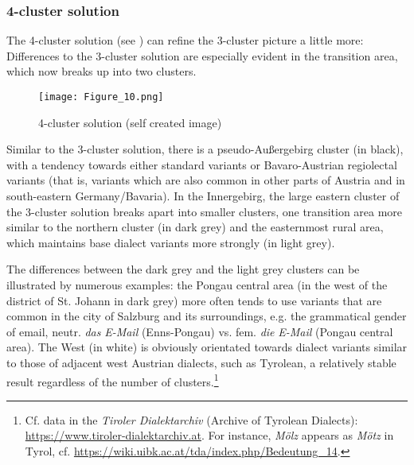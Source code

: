 \documentclass[output=paper,colorlinks, citecolor=brown]{langscibook}
\begin{document}
\subsubsection{4-cluster solution} \label{sec:blaßnigg:3.3.3}

The 4-cluster solution (see ) can refine the 3-cluster picture a little more: Differences to the 3-cluster solution are especially evident in the transition area, which now breaks up into two clusters.

  
\begin{figure}
\texttt{[image: Figure\_10.png]}
\caption{\label{fig:blaßnigg:10} 4-cluster solution (self created image)}
\end{figure}

Similar to the 3-cluster solution, there is a pseudo-Außergebirg cluster (in black), with a tendency towards either standard variants or Bavaro-Austrian regiolectal variants (that is, variants which are also common in other parts of Austria and in south-eastern Germany/Bavaria). In the Innergebirg, the large eastern cluster of the 3-cluster solution breaks apart into smaller clusters, one transition area more similar to the northern cluster (in dark grey) and the easternmost rural area, which maintains base dialect variants more strongly (in light grey).
\largerpage

The differences between the dark grey and the light grey clusters can be illustrated by numerous examples: the Pongau central area (in the west of the district of St. Johann in dark grey) more often tends to use variants that are common in the city of Salzburg and its surroundings, e.g. the grammatical gender of email, neutr. \textit{das} \textit{E-Mail} (Enns-Pongau) vs. fem. \textit{die} \textit{E-Mail} (Pongau central area). The West (in white) is obviously orientated towards dialect variants similar to those of adjacent west Austrian dialects, such as Tyrolean, a relatively stable result regardless of the number of clusters.\footnote{Cf. data in the \textit{Tiroler Dialektarchiv} (Archive of Tyrolean Dialects): \url{https://www.tiroler-dialektarchiv.at}. For instance, \textit{Mölz} appears as \textit{Mötz} in Tyrol, cf. \url{https://wiki.uibk.ac.at/tda/index.php/Bedeutung_14}.}
\end{document}
